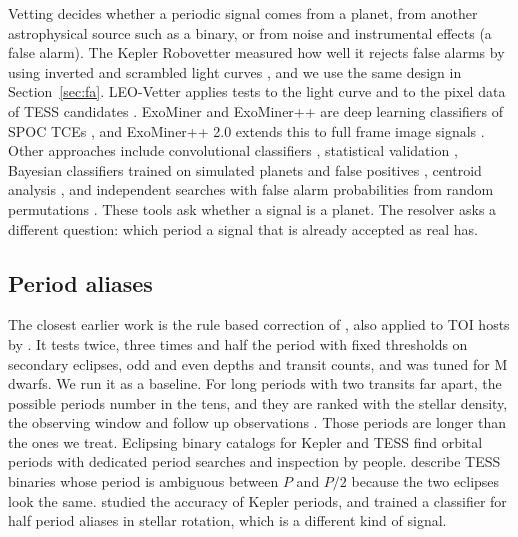 \documentclass[twocolumn,linenumbers]{aastex701}
\begin{document}
Vetting decides whether a periodic signal comes from a planet, from another astrophysical source such as a binary, or from noise and instrumental effects (a false alarm). The Kepler Robovetter measured how well it rejects false alarms by using inverted and scrambled light curves \citep{Coughlin2016,Thompson2018}, and we use the same design in Section~\ref{sec:fa}. LEO-Vetter applies tests to the light curve and to the pixel data of TESS candidates \citep{Kunimoto2025leo}. ExoMiner and ExoMiner++ are deep learning classifiers of SPOC TCEs \citep{Valizadegan2022,Valizadegan2025}, and ExoMiner++ 2.0 extends this to full frame image signals \citep{Martinho2026}. Other approaches include convolutional classifiers \citep{Shallue2018,Fiscale2025,DevoraPajares2025}, statistical validation \citep{Giacalone2021}, Bayesian classifiers trained on simulated planets and false positives \citep{Hadjigeorghiou2025}, centroid analysis \citep{Bryson2013,Kostov2019}, and independent searches with false alarm probabilities from random permutations \citep{Ivashtenko2025,Robnik2026}. These tools ask whether a signal is a planet. The resolver asks a different question: which period a signal that is already accepted as real has.

\subsection{Period aliases}

The closest earlier work is the rule based correction of \citet{Tschudi2026a}, also applied to TOI hosts by \citet{Tschudi2026b}. It tests twice, three times and half the period with fixed thresholds on secondary eclipses, odd and even depths and transit counts, and was tuned for M dwarfs. We run it as a baseline. For long periods with two transits far apart, the possible periods number in the tens, and they are ranked with the stellar density, the observing window and follow up observations \citep{Cooke2019,Cooke2021,Osborn2022,Hawthorn2024,Bass2025}. Those periods are longer than the ones we treat. Eclipsing binary catalogs for Kepler \citep{Kirk2016} and TESS \citep{Prsa2022,Kostov2025} find orbital periods with dedicated period searches and inspection by people. \citet{Prsa2022} describe TESS binaries whose period is ambiguous between $P$ and $P/2$ because the two eclipses look the same. \citet{Lissauer2024} studied the accuracy of Kepler periods, and \citet{Boyle2026} trained a classifier for half period aliases in stellar rotation, which is a different kind of signal.
\end{document}

